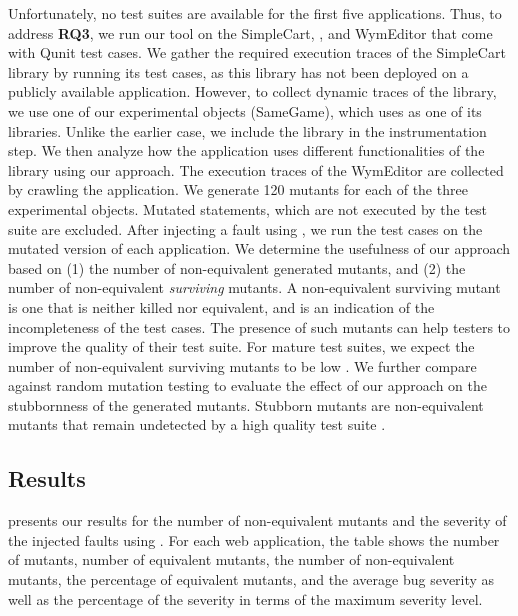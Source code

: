 Unfortunately, no test suites are available for the first five applications.  Thus, to address \textbf{RQ3}, we run our tool on the SimpleCart, \jquery, and WymEditor that come with Qunit test cases. We gather the required execution traces of the SimpleCart library by running its test cases, as this library has not been deployed
on a publicly available application. However, to collect dynamic traces of the \jquery library, we use one of our experimental objects (SameGame), which uses \jquery as one of its \javascript libraries. Unlike the earlier case, we include the \jquery library in the instrumentation step. We then analyze how the application uses different functionalities of the \jquery library using our approach. The execution traces of the WymEditor are collected by crawling the application. We generate 120 mutants for each of the three experimental objects. Mutated statements, which are not executed by the test suite are excluded. After injecting a fault using \mutandis, we run the test cases on the mutated version of each application. 
We determine the usefulness of our approach based on (1) the number of non-equivalent generated mutants, and (2) the number of non-equivalent \emph{surviving} mutants.  A non-equivalent surviving mutant  is one that is neither killed nor equivalent, and is an indication of the incompleteness of the test
cases. The presence of such mutants can help testers to improve the quality of their test suite. 
For mature test suites, we expect the number of non-equivalent surviving mutants to be low \cite{raise:jalbert12}. We further compare \mutandis against random mutation testing to evaluate the effect of our approach on the stubbornness of the generated mutants. Stubborn mutants are non-equivalent mutants that remain undetected by a high quality test suite \cite{yao:icse14}.



\subsection{Results}
  presents our results for the number of non-equivalent mutants and the severity of the injected faults using \mutandis.
For each web application, the table shows the number of mutants, number of equivalent mutants, the number of non-equivalent mutants, 
the percentage of equivalent mutants, and the average bug severity as well as the percentage of the severity in terms of the maximum severity level. 

